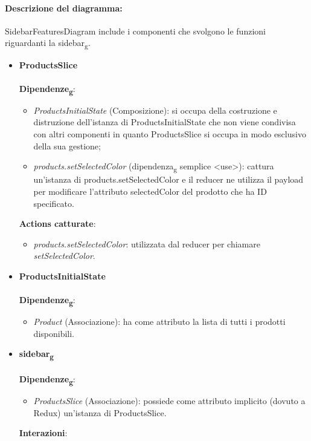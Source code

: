 	\paragraph*{Descrizione del diagramma:}
	SidebarFeaturesDiagram include i componenti che svolgono le funzioni riguardanti la sidebar\textsubscript{g}.
\begin{itemize}
		\item \textbf{ProductsSlice}
		\\\\
		\textbf{Dipendenze\textsubscript{g}}:
		\begin{itemize}
			\item \textit{ProductsInitialState} (Composizione): si occupa della costruzione e distruzione dell'istanza di ProductsInitialState
			che non viene condivisa con altri componenti in quanto ProductsSlice si occupa in modo esclusivo della sua gestione;
			\item \textit{products.setSelectedColor} (dipendenza\textsubscript{g} semplice \textless use\textgreater): cattura un'istanza di products.setSelectedColor e il 
			reducer ne utilizza il payload per modificare l'attributo selectedColor del prodotto che ha ID specificato.
		\end{itemize}
		\textbf{Actions catturate}:
		\begin{itemize}
			\item \textit{products.setSelectedColor}: utilizzata dal reducer per chiamare \textit{setSelectedColor}.
		\end{itemize}
		\item \textbf{ProductsInitialState}
		\\\\
		\textbf{Dipendenze\textsubscript{g}}:
		\begin{itemize}
			\item \textit{Product} (Associazione): ha come attributo la lista di tutti i prodotti disponibili.
		\end{itemize}
		\item \textbf{sidebar\textsubscript{g}}
		\\\\
		\textbf{Dipendenze\textsubscript{g}}:
		\begin{itemize}
			\item \textit{ProductsSlice} (Associazione): possiede come attributo implicito (dovuto a Redux) un'istanza di ProductsSlice.
		\end{itemize}
		\textbf{Interazioni}:
		\begin{itemize}

\end{itemize}
\end{itemize}
